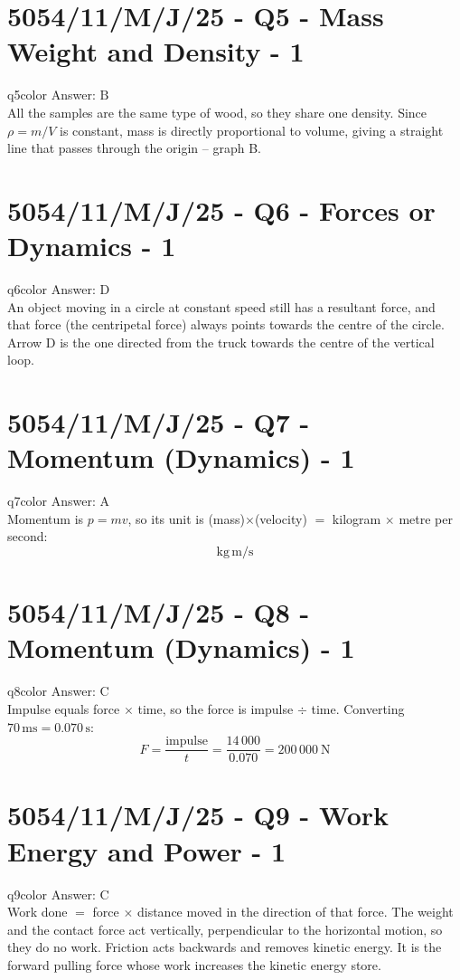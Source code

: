 \documentclass[11pt,a4paper]{article}
\newcommand{\examq}[4]{\section[#1 - Q#2]{#1 - Q#2 - #3 - #4}}
\begin{document}
\examq{5054/11/M/J/25}{5}{Mass Weight and Density}{1}

\begin{ansbox}{q5color}
Answer: $\boxed{\text{B}}$\\[4pt]
All the samples are the same type of wood, so they share one density. Since $\rho = m/V$ is constant, mass is directly proportional to volume, giving a straight line that passes through the origin -- graph B.
\end{ansbox}

\examq{5054/11/M/J/25}{6}{Forces or Dynamics}{1}

\begin{ansbox}{q6color}
Answer: $\boxed{\text{D}}$\\[4pt]
An object moving in a circle at constant speed still has a resultant force, and that force (the centripetal force) always points towards the centre of the circle. Arrow D is the one directed from the truck towards the centre of the vertical loop.
\end{ansbox}

\examq{5054/11/M/J/25}{7}{Momentum (Dynamics)}{1}

\begin{ansbox}{q7color}
Answer: $\boxed{\text{A}}$\\[4pt]
Momentum is $p = mv$, so its unit is (mass)$\times$(velocity) $=$ kilogram $\times$ metre per second:
\[
\boxed{\mathrm{kg\,m/s}}
\]
\end{ansbox}

\examq{5054/11/M/J/25}{8}{Momentum (Dynamics)}{1}

\begin{ansbox}{q8color}
Answer: $\boxed{\text{C}}$\\[4pt]
Impulse equals force $\times$ time, so the force is impulse $\div$ time. Converting $70\,\mathrm{ms} = 0.070\,\mathrm{s}$:
\[
F = \frac{\text{impulse}}{t} = \frac{14\,000}{0.070} = \boxed{200\,000\ \mathrm{N}}
\]
\end{ansbox}

\examq{5054/11/M/J/25}{9}{Work Energy and Power}{1}

\begin{ansbox}{q9color}
Answer: $\boxed{\text{C}}$\\[4pt]
Work done $=$ force $\times$ distance moved in the direction of that force. The weight and the contact force act vertically, perpendicular to the horizontal motion, so they do no work. Friction acts backwards and removes kinetic energy. It is the forward pulling force whose work increases the kinetic energy store.
\end{ansbox}
\end{document}
